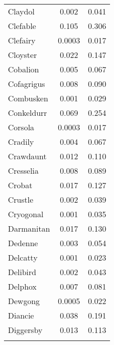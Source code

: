 \documentclass[12pt,twoside]{reedthesis}
\begin{document}
\begin{table}[!htbp]
\begin{tabular}{@{\extracolsep{5pt}}lcc}
  Claydol & 0.002 & 0.041 \\ 
  Clefable & 0.105 & 0.306 \\ 
  Clefairy & 0.0003 & 0.017 \\ 
  Cloyster & 0.022 & 0.147 \\ 
  Cobalion & 0.005 & 0.067 \\ 
  Cofagrigus & 0.008 & 0.090 \\ 
  Combusken & 0.001 & 0.029 \\ 
  Conkeldurr & 0.069 & 0.254 \\ 
  Corsola & 0.0003 & 0.017 \\ 
  Cradily & 0.004 & 0.067 \\ 
  Crawdaunt & 0.012 & 0.110 \\ 
  Cresselia & 0.008 & 0.089 \\ 
  Crobat & 0.017 & 0.127 \\ 
  Crustle & 0.002 & 0.039 \\ 
  Cryogonal & 0.001 & 0.035 \\ 
  Darmanitan & 0.017 & 0.130 \\ 
  Dedenne & 0.003 & 0.054 \\ 
  Delcatty & 0.001 & 0.023 \\ 
  Delibird & 0.002 & 0.043 \\ 
  Delphox & 0.007 & 0.081 \\ 
  Dewgong & 0.0005 & 0.022 \\ 
  Diancie & 0.038 & 0.191 \\ 
  Diggersby & 0.013 & 0.113 \\ 
  \hline \\[-1.8ex] 
  \end{tabular} 
  \end{table}
  
\end{document}
